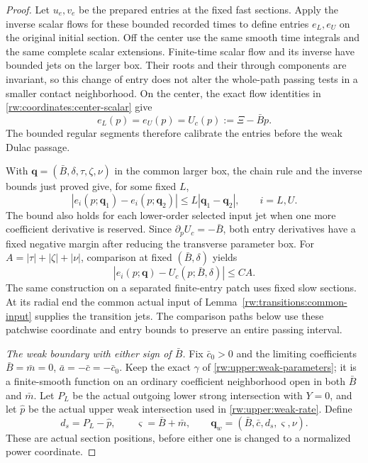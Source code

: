 \begin{proof}
Let $u_e,v_e$ be the prepared entries at the fixed fast sections.
Apply the inverse scalar flows for these bounded recorded times to
define entries $e_L,e_U$ on the original initial section. Off the
center use the same smooth time integrals and the same complete scalar
extensions. Finite-time scalar flow and its inverse have bounded jets
on the larger box. Their roots and their through components are
invariant, so this change of entry does not alter the whole-path
passing tests in a smaller contact neighborhood. On the center, the
exact flow identities in \eqref{rw:coordinates:center-scalar} give
\begin{equation}\label{rw:coordinates:calibrated-entry}
 e_L(p)=e_U(p)=U_c(p):=\Xi-\bar Bp.
\end{equation}
The bounded regular segments therefore calibrate the entries before
the weak Dulac passage.

With $\mathbf q=(\bar B,\delta,\tau,\zeta,\nu)$ in the common
larger box, the chain rule and the inverse bounds just proved give,
for some fixed $L$,
\begin{equation}\label{rw:coordinates:entry-lipschitz}
 |e_i(p;\mathbf q_1)-e_i(p;\mathbf q_2)|
       \le L|\mathbf q_1-\mathbf q_2|,\qquad i=L,U.
\end{equation}
The bound also holds for each lower-order selected input jet when
one more coefficient derivative is reserved. Since
$\partial_pU_c=-\bar B$, both entry derivatives have a fixed
negative margin after reducing the transverse parameter box.
For $A=|\tau|+|\zeta|+|\nu|$, comparison at fixed
$(\bar B,\delta)$ yields
\begin{equation}\label{rw:coordinates:entry-center-error}
 |e_i(p;\mathbf q)-U_c(p;\bar B,\delta)|\le CA.
\end{equation}
The same construction on a separated finite-entry patch uses fixed
slow sections. At its radial end the common actual input of
Lemma~\ref{rw:transitions:common-input} supplies the transition jets.
The comparison paths below use these patchwise coordinate and entry
bounds to preserve an entire passing interval.

\par\smallskip\noindent\textit{The weak boundary with either sign of $\bar B$.}
Fix $\bar c_0>0$ and the limiting coefficients
$\bar B=\bar m=0$, $\bar a=-\bar c=-\bar c_0$.
Keep the exact $\gamma$ of \eqref{rw:upper:weak-parameters}; it is a
finite-smooth function on an ordinary coefficient neighborhood open in
both $\bar B$ and $\bar m$. Let $P_L$ be the actual outgoing lower
strong intersection with $Y=0$, and let $\widehat p$ be the actual
upper weak intersection used in \eqref{rw:upper:weak-rate}. Define
\begin{equation}\label{rw:coordinates:weak}
 d_s=P_L-\widehat p,\qquad \varsigma=\bar B+\bar m,
 \qquad\mathbf q_w=(\bar B,\bar c,d_s,\varsigma,\nu).
\end{equation}
These are actual section positions, before either one is changed to a
normalized power coordinate.


\end{proof}
